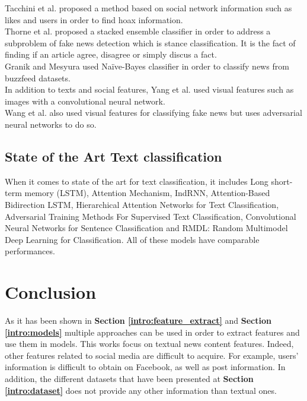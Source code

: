 Tacchini et al.\cite{Tacchini2017} proposed a method based on social network information such as likes and users in order to find hoax information.\\

Thorne et al.\cite{Thorne2017} proposed a stacked ensemble classifier in order to address a subproblem of fake news detection which is stance classification. It is the fact of finding if an article agree, disagree or simply discus a fact. \\

Granik and Mesyura\cite{Granik2017} used Na\"ive-Bayes classifier in order to classify news from buzzfeed datasets.\\

In addition to texts and social features, Yang et al.\cite{Yang2018} used visual features such as images with a convolutional neural network. \\

Wang et al.\cite{Wang2018} also used visual features for classifying fake news but uses adversarial neural networks to do so. 
\subsection{State of the Art Text classification}
When it comes to state of the art for text classification, it includes Long short-term memory (LSTM)\cite{Hochreiter1997LongSM}, Attention Mechanism\cite{Vaswani2017AttentionIA}, IndRNN\cite{Li2018}, Attention-Based Bidirection LSTM\cite{zhou-etal-2016-attention}, Hierarchical Attention Networks for Text Classification\cite{yang_hierarchical_2016}, Adversarial Training Methods For Supervised Text Classification\cite{miyato_adversarial_2016}, Convolutional Neural Networks for Sentence Classification\cite{kim_convolutional_2014} and RMDL: Random Multimodel Deep Learning for Classification\cite{kowsari_rmdl:_2018}. All of these models have comparable performances. 
\section{Conclusion}
As it has been shown in \textbf{Section \ref{intro:feature_extract}} and \textbf{Section \ref{intro:models}} multiple approaches can be used in order to extract features and use them in models. This works focus on textual news content features. Indeed, other features related to social media are difficult to acquire. For example, users’ information is difficult to obtain on Facebook, as well as post information. In addition, the different datasets that have been presented at \textbf{Section \ref{intro:dataset}} does not provide any other information than textual ones. \\

